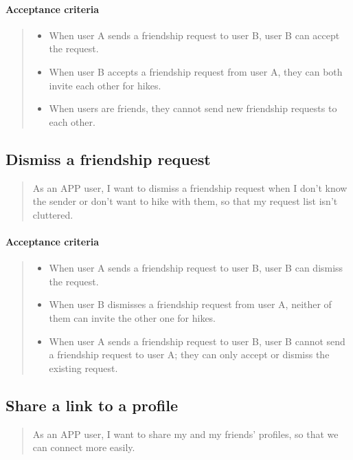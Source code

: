 \paragraph*{Acceptance criteria}
\begin{quote}
\begin{itemize}
    \item When user A sends a friendship request to user B, user B can accept the request.
    \item When user B accepts a friendship request from user A, they can both invite each other for hikes.
    \item When users are friends, they cannot send new friendship requests to each other.
\end{itemize}
\end{quote}


\subsection{Dismiss a friendship request}\label{US:friends-dismiss}
\begin{quote}
As an APP user, I want to dismiss a friendship request when I don't know the sender or don't want to hike with them, so that my request list isn't cluttered.
\end{quote}

\paragraph*{Acceptance criteria} 
\begin{quote}
\begin{itemize}
    \item When user A sends a friendship request to user B, user B can dismiss the request.
    \item When user B dismisses a friendship request from user A, neither of them can invite the other one for hikes.
    \item When user A sends a friendship request to user B, user B cannot send a friendship request to user A; they can only accept or dismiss the existing request.
\end{itemize}
\end{quote}

\subsection{Share a link to a profile}\label{US:friends-share}
\begin{quote}
    As an APP user, I want to share my and my friends' profiles, so that we can connect more easily.
\end{quote}

